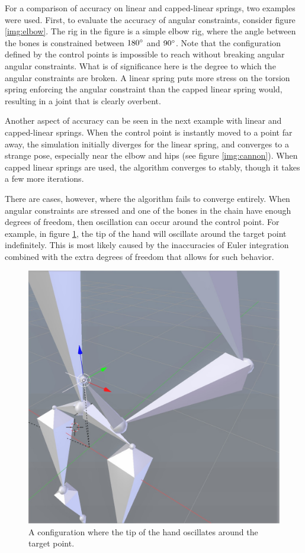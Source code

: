 \documentclass[10pt,twocolumn,letterpaper]{article}
\begin{document}
For a comparison of accuracy on linear and capped-linear springs, two examples were used. First, to evaluate the accuracy of angular constraints, consider figure \ref{img:elbow}. The rig in the figure is a simple elbow rig, where the angle between the bones is constrained between $180\degree$ and $90\degree$. Note that the configuration defined by the control points is impossible to reach without breaking angular angular constraints. What is of significance here is the degree to which the angular constraints are broken. A linear spring puts more stress on the torsion spring enforcing the angular constraint than the capped linear spring would, resulting in a joint that is clearly overbent.

Another aspect of accuracy can be seen in the next example with linear and capped-linear springs. When the control point is instantly moved to a point far away, the simulation initially diverges for the linear spring, and converges to a strange pose, especially near the elbow and hips (see figure \ref{img:cannon}). When capped linear springs are used, the algorithm converges to stably, though it takes a few more iterations.


There are cases, however, where the algorithm fails to converge entirely. When angular constraints are stressed and one of the bones in the chain have enough degrees of freedom, then oscillation can occur around the control point. For example, in figure \ref{img:wobble}, the tip of the hand will oscillate around the target point indefinitely. This is most likely caused by the inaccuracies of Euler integration combined with the extra degrees of freedom that allows for such behavior.

\begin{figure}[h]
    \centering
    \includegraphics[width=0.7\columnwidth] {wobble-frame.jpg}
    \caption{A configuration where the tip of the hand oscillates around the target point.}
    \label{img:wobble}
\end{figure}
\end{document}
